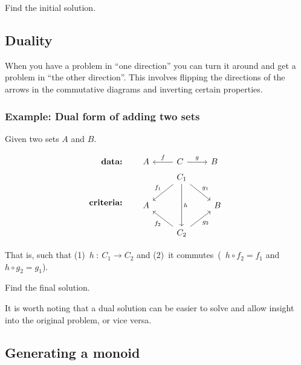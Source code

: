 \begin{exercise}
    Find the initial solution. \label{ex:addsets}
\end{exercise}

\subsection{Duality}

When you have a problem in ``one direction'' you can turn it around and get a
problem in ``the other direction''. This involves flipping the directions of the
arrows in the commutative diagrams and inverting certain properties.

\subsubsection*{Example: Dual form of adding two sets}

Given two sets $A$ and $B$.

\begin{align*}
     \textbf{data:}\qquad & \begin{tikzcd}[ampersand replacement=\&]
            A \& C \arrow[l, swap, "f"] \arrow[r, "g"] \& B
        \end{tikzcd} \\
    \textbf{criteria:}\qquad & \begin{tikzcd}[ampersand replacement=\&]
          {} \& C_1 \arrow[dd, "h"] \arrow[ld, swap, "f_1"] \arrow[rd, "g_1"]
          \& {} \\ A \& {} \& B \\
          {} \& C_2 \arrow[lu, "f_2"] \arrow[ru, swap, "g_2"] \& {}
      \end{tikzcd}
\end{align*}



That is, such that (1)~$h\ :\ C_1 \rightarrow C_2$ and (2)~it 
commutes~(\ie~$h \circ f_2 = f_1$ and $h \circ g_2 = g_1$).

\begin{exercise}
    Find the final solution. \label{ex:dual}
\end{exercise}

It is worth noting that a dual solution can be easier to solve and allow insight
into the original problem, or vice versa.

\subsection{Generating a monoid}

